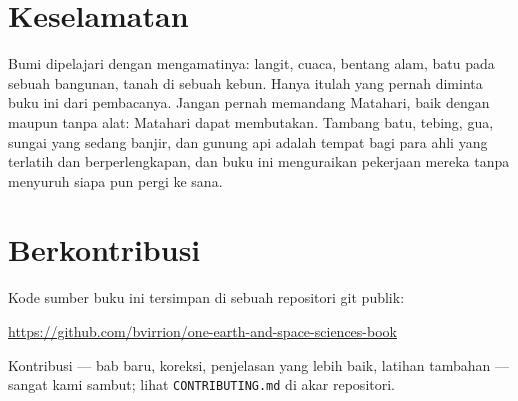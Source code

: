 \section*{Keselamatan}

Bumi dipelajari dengan mengamatinya: langit, cuaca, bentang alam, batu
pada sebuah bangunan, tanah di sebuah kebun. Hanya itulah yang pernah
diminta buku ini dari pembacanya. Jangan pernah memandang Matahari, baik
dengan maupun tanpa alat: Matahari dapat membutakan. Tambang batu,
tebing, gua, sungai yang sedang banjir, dan gunung api adalah tempat bagi
para ahli yang terlatih dan berperlengkapan, dan buku ini menguraikan
pekerjaan mereka tanpa menyuruh siapa pun pergi ke sana.

\section*{Berkontribusi}

Kode sumber buku ini tersimpan di sebuah repositori git publik:
\begin{center}
\url{https://github.com/bvirrion/one-earth-and-space-sciences-book}
\end{center}
Kontribusi --- bab baru, koreksi, penjelasan yang lebih baik, latihan
tambahan --- sangat kami sambut; lihat \texttt{CONTRIBUTING.md} di akar
repositori.
